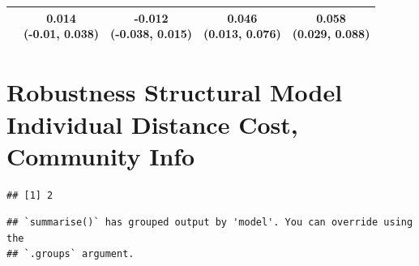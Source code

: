 \documentclass[
]{article}
\begin{document}
\begin{table}
{\begin{tabular}[t]{lcccc}
 & \makecell[c]{0.014\\(-0.01, 0.038)} & \makecell[c]{-0.012\\(-0.038, 0.015)} & \makecell[c]{0.046\\(0.013, 0.076)} & \makecell[c]{0.058\\(0.029, 0.088)}\\
\bottomrule
\end{tabular}}
\end{table}

\section{Robustness Structural Model Individual Distance Cost, Community
Info}\label{robustness-structural-model-individual-distance-cost-community-info}

\begin{verbatim}
## [1] 2
\end{verbatim}

\begin{verbatim}
## `summarise()` has grouped output by 'model'. You can override using the
## `.groups` argument.
\end{verbatim}
\end{document}
